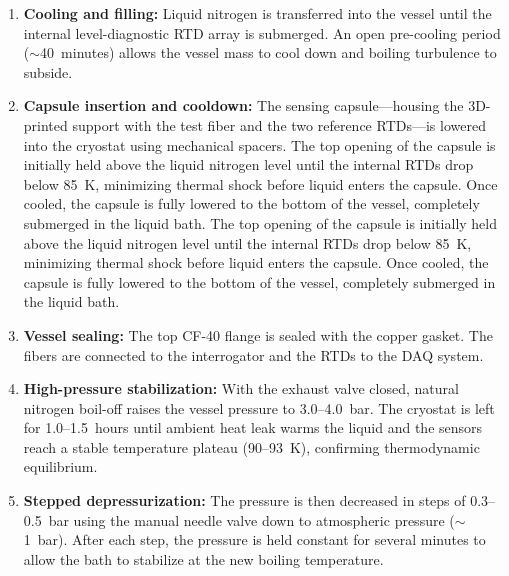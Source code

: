 \documentclass[preprint,11pt]{elsarticle}
\begin{document}
\begin{enumerate}
    \item \textbf{Cooling and filling:} Liquid nitrogen is transferred into the vessel until the internal level-diagnostic RTD array is submerged. An open pre-cooling period ($\sim$40~minutes) allows the vessel mass to cool down and boiling turbulence to subside.
    \item \textbf{Capsule insertion and cooldown:} The sensing capsule---housing the 3D-printed support with the test fiber and the two reference RTDs---is lowered into the cryostat using mechanical spacers. The top opening of the capsule is initially held above the liquid nitrogen level until the internal RTDs drop below 85~K, minimizing thermal shock before liquid enters the capsule. Once cooled, the capsule is fully lowered to the bottom of the vessel, completely submerged in the liquid bath. The top opening of the capsule is initially held above the liquid nitrogen level until the internal RTDs drop below 85~K, minimizing thermal shock before liquid enters the capsule. Once cooled, the capsule is fully lowered to the bottom of the vessel, completely submerged in the liquid bath.
    \item \textbf{Vessel sealing:} The top CF-40 flange is sealed with the copper gasket. The fibers are connected to the interrogator and the RTDs to the DAQ system.
    \item \textbf{High-pressure stabilization:} With the exhaust valve closed, natural nitrogen boil-off raises the vessel pressure to 3.0--4.0~bar. The cryostat is left for 1.0--1.5~hours until ambient heat leak warms the liquid and the sensors reach a stable temperature plateau (90--93~K), confirming thermodynamic equilibrium.
    \item \textbf{Stepped depressurization:} The pressure is then decreased in steps of 0.3--0.5~bar using the manual needle valve down to atmospheric pressure ($\sim$1~bar). After each step, the pressure is held constant for several minutes to allow the bath to stabilize at the new boiling temperature.
\end{enumerate}
\end{document}
